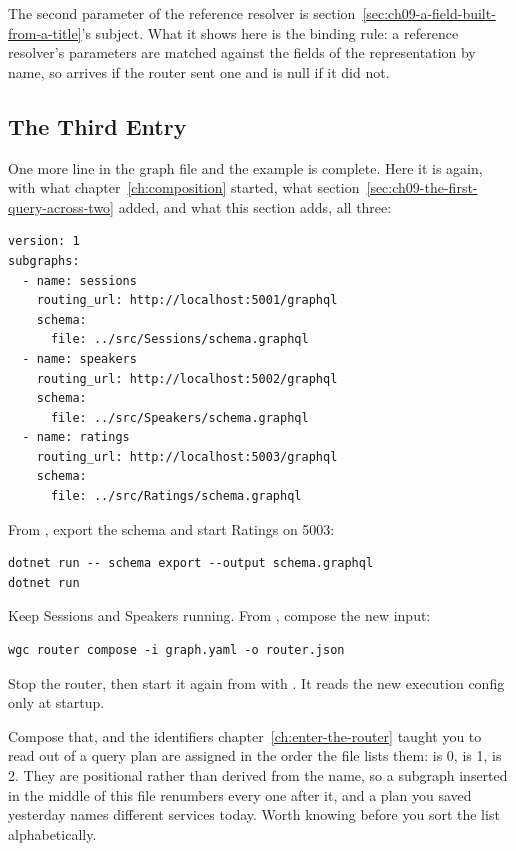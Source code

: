 %
The second parameter of the reference resolver is
section~\ref{sec:ch09-a-field-built-from-a-title}'s subject. What it shows here
is the binding rule: a reference resolver's parameters are matched against the
fields of the representation by name, so  arrives if the router
sent one and is null if it did not.

\subsection{The Third Entry}

%
One more line in the graph file and the example is complete. Here it is again,
with what chapter~\ref{ch:composition} started, what
section~\ref{sec:ch09-the-first-query-across-two} added, and what this section
adds, all three:

\begin{verbatim}
version: 1
subgraphs:
  - name: sessions
    routing_url: http://localhost:5001/graphql
    schema:
      file: ../src/Sessions/schema.graphql
  - name: speakers
    routing_url: http://localhost:5002/graphql
    schema:
      file: ../src/Speakers/schema.graphql
  - name: ratings
    routing_url: http://localhost:5003/graphql
    schema:
      file: ../src/Ratings/schema.graphql
\end{verbatim}

From , export the schema and start Ratings on 5003:

\begin{verbatim}
dotnet run -- schema export --output schema.graphql
dotnet run
\end{verbatim}

Keep Sessions and Speakers running. From , compose the new input:

\begin{verbatim}
wgc router compose -i graph.yaml -o router.json
\end{verbatim}

Stop the router, then start it again from  with
. It reads the new execution config only
at startup.

%
Compose that, and the identifiers chapter~\ref{ch:enter-the-router} taught you
to read out of a query plan are assigned in the order the file lists them:
 is 0,  is 1,  is 2. They are
positional rather than derived from the name, so a subgraph inserted in the
middle of this file renumbers every one after it, and a plan you saved
yesterday names different services today. Worth knowing before you sort the
list alphabetically.
%

